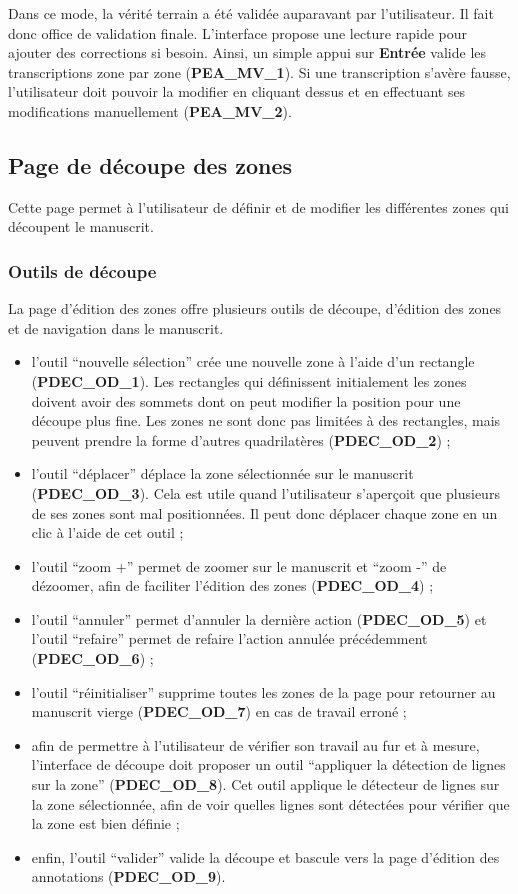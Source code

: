 Dans ce mode, la vérité terrain a été validée auparavant par l’utilisateur.
Il fait donc office de validation finale. L’interface propose une lecture
rapide pour ajouter des corrections si besoin. Ainsi, un simple appui sur
\textbf{Entrée} valide les transcriptions zone par zone (\textbf{PEA\_MV\_1}).
Si une transcription s’avère fausse, l’utilisateur doit pouvoir la modifier
en cliquant dessus et en effectuant ses modifications manuellement
(\textbf{PEA\_MV\_2}).

\subsection{Page de découpe des zones}

Cette page permet à l’utilisateur de définir et de modifier les différentes
zones qui découpent le manuscrit.

\subsubsection{Outils de découpe}

La page d’édition des zones offre plusieurs outils de découpe, d’édition des
zones et de navigation dans le manuscrit.
\begin{itemize}
\item l’outil “nouvelle sélection” crée une nouvelle zone à l’aide d’un
rectangle (\textbf{PDEC\_OD\_1}). Les rectangles qui définissent initialement
les zones doivent avoir des sommets dont on peut modifier la position pour
une découpe plus fine. Les zones ne sont donc pas limitées à des rectangles,
mais peuvent prendre la forme d’autres quadrilatères (\textbf{PDEC\_OD\_2}) ;
\item l’outil “déplacer” déplace la zone sélectionnée sur le manuscrit
(\textbf{PDEC\_OD\_3}). Cela est utile quand l’utilisateur s’aperçoit que
plusieurs de ses zones sont mal positionnées. Il peut donc déplacer chaque
zone en un clic à l’aide de cet outil ;
\item l’outil “zoom +” permet de zoomer sur le manuscrit et “zoom -” de
dézoomer, afin de faciliter l’édition des zones (\textbf{PDEC\_OD\_4}) ;
\item l’outil “annuler” permet d’annuler la dernière action
(\textbf{PDEC\_OD\_5}) et l’outil “refaire” permet de refaire l’action
annulée précédemment (\textbf{PDEC\_OD\_6}) ;
\item l’outil “réinitialiser” supprime toutes les zones de la page pour
retourner au manuscrit vierge (\textbf{PDEC\_OD\_7}) en cas de travail erroné ;
\item afin de permettre à l’utilisateur de vérifier son travail au fur et à
mesure, l’interface de découpe doit proposer un outil “appliquer la détection
de lignes sur la zone” (\textbf{PDEC\_OD\_8}). Cet outil applique le détecteur
de lignes sur la zone sélectionnée, afin de voir quelles lignes sont détectées
pour vérifier que la zone est bien définie ;
\item enfin, l’outil “valider” valide la découpe et bascule vers la page
d’édition des annotations (\textbf{PDEC\_OD\_9}).
\end{itemize}

